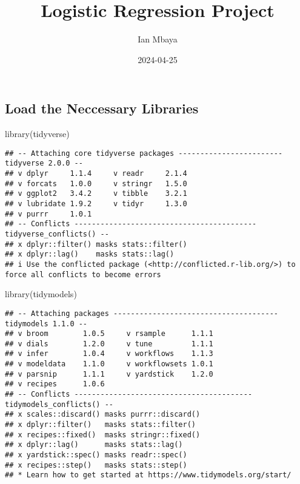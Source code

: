 \documentclass[
]{article}
\title{Logistic Regression Project}
\author{Ian Mbaya}
\date{2024-04-25}
\newenvironment{Shaded}{\begin{snugshade}}{\end{snugshade}}
\newcommand{\FunctionTok}[1]{\textcolor[rgb]{0.00,0.00,0.00}{#1}}
\newcommand{\NormalTok}[1]{#1}
\newcommand{\StringTok}[1]{\textcolor[rgb]{0.31,0.60,0.02}{#1}}
\begin{document}
\maketitle

\hypertarget{load-the-neccessary-libraries}{%
\subsection{Load the Neccessary
Libraries}\label{load-the-neccessary-libraries}}

\begin{Shaded}
\begin{Highlighting}[]
\FunctionTok{library}\NormalTok{(}\StringTok{\textquotesingle{}tidyverse\textquotesingle{}}\NormalTok{)}
\end{Highlighting}
\end{Shaded}

\begin{verbatim}
## -- Attaching core tidyverse packages ------------------------ tidyverse 2.0.0 --
## v dplyr     1.1.4     v readr     2.1.4
## v forcats   1.0.0     v stringr   1.5.0
## v ggplot2   3.4.2     v tibble    3.2.1
## v lubridate 1.9.2     v tidyr     1.3.0
## v purrr     1.0.1     
## -- Conflicts ------------------------------------------ tidyverse_conflicts() --
## x dplyr::filter() masks stats::filter()
## x dplyr::lag()    masks stats::lag()
## i Use the conflicted package (<http://conflicted.r-lib.org/>) to force all conflicts to become errors
\end{verbatim}

\begin{Shaded}
\begin{Highlighting}[]
\FunctionTok{library}\NormalTok{(}\StringTok{\textquotesingle{}tidymodels\textquotesingle{}}\NormalTok{)}
\end{Highlighting}
\end{Shaded}

\begin{verbatim}
## -- Attaching packages -------------------------------------- tidymodels 1.1.0 --
## v broom        1.0.5     v rsample      1.1.1
## v dials        1.2.0     v tune         1.1.1
## v infer        1.0.4     v workflows    1.1.3
## v modeldata    1.1.0     v workflowsets 1.0.1
## v parsnip      1.1.1     v yardstick    1.2.0
## v recipes      1.0.6     
## -- Conflicts ----------------------------------------- tidymodels_conflicts() --
## x scales::discard() masks purrr::discard()
## x dplyr::filter()   masks stats::filter()
## x recipes::fixed()  masks stringr::fixed()
## x dplyr::lag()      masks stats::lag()
## x yardstick::spec() masks readr::spec()
## x recipes::step()   masks stats::step()
## * Learn how to get started at https://www.tidymodels.org/start/
\end{verbatim}
\end{document}
